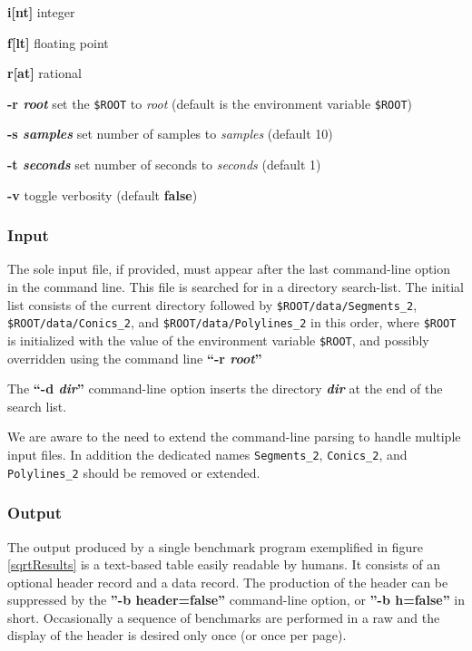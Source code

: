\begin{list}{}
\begin{list}{}
\begin{list}{}
{	  \settowidth{\listparindent}{abcdefg}
	}
	\item[\bf{i[nt]}\hfill] integer
	\item[\bf{f[lt]}\hfill] floating point
	\item[\bf{r[at]}\hfill] rational
      \end{list}
  \end{list}
\item[\bf{-r {\em root}}\hfill]
  set the {\tt \$ROOT} to {\em root} (default is the environment
  variable {\tt \$ROOT})
\item[\bf{-s {\em samples}}\hfill]
  set number of samples to {\em samples} (default 10)
\item[\bf{-t {\em seconds}}\hfill]
  set number of seconds to {\em seconds} (default 1)
\item[\bf{-v}\hfill]
  toggle verbosity (default \textbf{false})
\end{list}

\subsubsection{Input}
The sole input file, if provided, must appear after the last
command-line option in the command line. This file is searched for in
a directory search-list. The initial list consists of the current
directory followed by {\tt \$ROOT/data/Segments\_2},
{\tt \$ROOT/data/Conics\_2}, and {\tt \$ROOT/data/Polylines\_2} in
this order, where {\tt \$ROOT} is initialized with the value of the
environment variable {\tt \$ROOT}, and possibly overridden using the
command line \textbf{``-r {\em root}''}

The \textbf{``-d {\em dir}''} command-line option inserts the
directory \textbf{\em dir} at the end of the search list.

We are aware to the need to extend the command-line parsing to handle
multiple input files. In addition the dedicated names
{\tt Segments\_2}, {\tt Conics\_2}, and {\tt Polylines\_2} should be
removed or extended.

\subsubsection{Output}
The output produced by a single benchmark program exemplified in
figure \ref{sqrtResults} is a text-based table easily readable by
humans. It consists of an optional header record and a data
record. The production of the header can be suppressed by the
\textbf{''-b header=false''} command-line option, or
\textbf{''-b h=false''} in short. Occasionally a sequence of
benchmarks are performed in a raw and the display of the header is
desired only once (or once per page).

